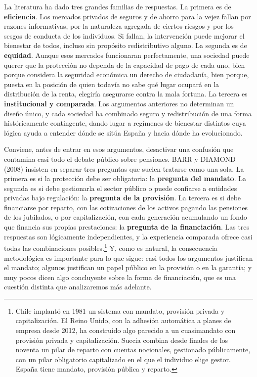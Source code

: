 \documentclass[10pt,a4paper]{article}
\begin{document}
La literatura ha dado tres grandes familias de respuestas. La primera es de \textbf{eficiencia}. Los mercados privados de seguros y de ahorro para la vejez fallan por razones informativas, por la naturaleza agregada de ciertos riesgos y por los sesgos de conducta de los individuos. Si fallan, la intervención puede mejorar el bienestar de todos, incluso sin propósito redistributivo alguno. La segunda es de \textbf{equidad}. Aunque esos mercados funcionaran perfectamente, una sociedad puede querer que la protección no dependa de la capacidad de pago de cada uno, bien porque considera la seguridad económica un derecho de ciudadanía, bien porque, puesta en la posición de quien todavía no sabe qué lugar ocupará en la distribución de la renta, elegiría asegurarse contra la mala fortuna. La tercera es \textbf{institucional y comparada}. Los argumentos anteriores no determinan un diseño único, y cada sociedad ha combinado seguro y redistribución de una forma históricamente contingente, dando lugar a regímenes de bienestar distintos cuya lógica ayuda a entender dónde se sitúa España y hacia dónde ha evolucionado.

Conviene, antes de entrar en esos argumentos, desactivar una confusión que contamina casi todo el debate público sobre pensiones. BARR y DIAMOND (2008) insisten en separar tres preguntas que suelen tratarse como una sola. La primera es si la protección debe ser obligatoria: la \textbf{pregunta del mandato}. La segunda es si debe gestionarla el sector público o puede confiarse a entidades privadas bajo regulación: la \textbf{pregunta de la provisión}. La tercera es si debe financiarse por reparto, con las cotizaciones de los activos pagando las pensiones de los jubilados, o por capitalización, con cada generación acumulando un fondo que financia sus propias prestaciones: la \textbf{pregunta de la financiación}. Las tres respuestas son lógicamente independientes, y la experiencia comparada ofrece casi todas las combinaciones posibles.\footnote{Chile implantó en 1981 un sistema con mandato, provisión privada y capitalización. El Reino Unido, con la adhesión automática a planes de empresa desde 2012, ha construido algo parecido a un cuasimandato con provisión privada y capitalización. Suecia combina desde finales de los noventa un pilar de reparto con cuentas nocionales, gestionado públicamente, con un pilar obligatorio capitalizado en el que el individuo elige gestor. España tiene mandato, provisión pública y reparto.
} Y, como es natural, la consecuencia metodológica es importante para lo que sigue: casi todos los argumentos justifican el mandato; algunos justifican un papel público en la provisión o en la garantía; y muy pocos dicen algo concluyente sobre la forma de financiación, que es una cuestión distinta que analizaremos más adelante.
\end{document}
